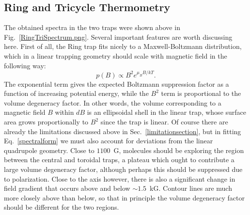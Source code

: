 \documentclass[defaultstyle,11pt]{thesis}
\begin{document}
\subsection{Ring and Tricycle Thermometry}

The obtained spectra in the two traps were shown above in Fig.~\ref{RingTriSpectrum.png}.
Several important features are worth discussing here.
First of all, the Ring trap fits nicely to a Maxwell-Boltzmann distribution, which in a linear trapping geometry should scale with magnetic field in the following way:
\begin{equation}
\label{spectralform}
p(B)\propto B^2e^{\mu_B B/kT}.
\end{equation}
The exponential term gives the expected Boltzmann suppression factor as a function of increasing potential energy, while the $B^2$ term is proportional to the volume degeneracy factor.
In other words, the volume corresponding to a magnetic field $B$ within $dB$ is an ellipsoidal shell in the linear trap, whose surface area grows proportionally to $B^2$ since the trap is linear.
Of course there are already the limitations discussed above in Sec.~\ref{limitationsection}, but in fitting Eq.~\ref{spectralform} we must also account for deviations from the linear quadrupole geometry.
Close to $1100$~G, molecules should be exploring the region between the central and toroidal traps, a plateau which ought to contribute a large volume degeneracy factor, although perhaps this should be suppressed due to polarization.
Close to the axis however, there is also a significant change in field gradient that occurs above and below $\sim1.5$~kG. Contour lines are much more closely above  than below, so that in principle the volume degeneracy factor should be different for the two regions.
\end{document}
